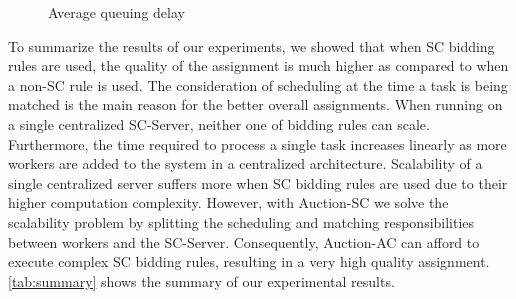 \begin{figure}[h]
    \centering
    \vspace{-0.15in}
    \caption{Average queuing delay}
    \label{fig:queue}
\end{figure}

To summarize the results of our experiments, we showed that when SC bidding rules are used, the quality of the assignment is much higher as compared to when a non-SC rule is used. The consideration of scheduling at the time a task is being matched is the main reason for the better overall assignments. When running on a single centralized SC-Server, neither one of bidding rules can scale. Furthermore, the time required to process a single task increases linearly as more workers are added to the system in a centralized architecture. Scalability of a single centralized server suffers more when SC bidding rules are used due to their higher computation complexity. However, with Auction-SC we solve the scalability problem by splitting the scheduling and matching responsibilities between workers and the SC-Server. Consequently, Auction-AC can afford to execute complex SC bidding rules, resulting in a very high quality assignment. \cref{tab:summary} shows the summary of our experimental results.

